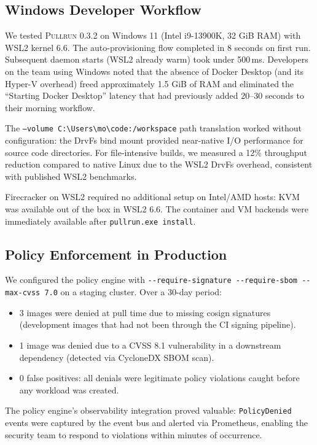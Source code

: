 \documentclass[11pt,a4paper]{article}
\newcommand{\pullrun}{\textsc{Pullrun}}
\begin{document}
\subsection{Windows Developer Workflow}

We tested \pullrun{} 0.3.2 on Windows 11 (Intel i9-13900K, 32 GiB RAM) with WSL2 kernel 6.6. The auto-provisioning flow completed in 8 seconds on first run. Subsequent daemon starts (WSL2 already warm) took under 500\,ms. Developers on the team using Windows noted that the absence of Docker Desktop (and its Hyper-V overhead) freed approximately 1.5 GiB of RAM and eliminated the ``Starting Docker Desktop'' latency that had previously added 20--30 seconds to their morning workflow.

The \texttt{--volume C:\textbackslash{}Users\textbackslash{}mo\textbackslash{}code:/workspace} path translation worked without configuration: the DrvFs bind mount provided near-native I/O performance for source code directories. For file-intensive builds, we measured a 12\% throughput reduction compared to native Linux due to the WSL2 DrvFs overhead, consistent with published WSL2 benchmarks.

Firecracker on WSL2 required no additional setup on Intel/AMD hosts: KVM was available out of the box in WSL2 6.6. The container and VM backends were immediately available after \texttt{pullrun.exe install}.

\subsection{Policy Enforcement in Production}

We configured the policy engine with \texttt{-{}-require-signature -{}-require-sbom -{}-max-cvss 7.0} on a staging cluster. Over a 30-day period:

\begin{itemize}[leftmargin=*]
    \item 3 images were denied at pull time due to missing cosign signatures (development images that had not been through the CI signing pipeline).
    \item 1 image was denied due to a CVSS 8.1 vulnerability in a downstream dependency (detected via CycloneDX SBOM scan).
    \item 0 false positives: all denials were legitimate policy violations caught before any workload was created.
\end{itemize}

The policy engine's observability integration proved valuable: \texttt{PolicyDenied} events were captured by the event bus and alerted via Prometheus, enabling the security team to respond to violations within minutes of occurrence.
\end{document}
